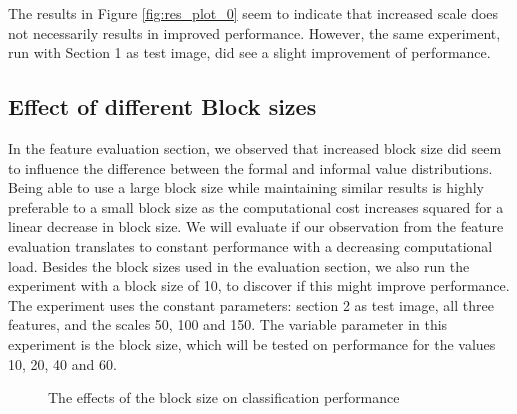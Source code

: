 The results in Figure \ref{fig:res_plot_0} seem to indicate that increased scale does not necessarily results in improved performance. However, the same experiment, run with Section 1 as test image, did see a slight improvement of performance.

\subsection{Effect of different Block sizes}
In the feature evaluation section, we observed that increased block size did seem to influence the difference between the formal and informal value distributions. Being able to use a large block size while maintaining similar results is highly preferable to a small block size as the computational cost increases squared for a linear decrease in block size. We will evaluate if our observation from the feature evaluation translates to constant performance with a decreasing computational load. Besides the block sizes used in the evaluation section, we also run the experiment with a block size of 10, to discover if this might improve performance. The experiment uses the constant parameters: section 2 as test image, all three features, and the scales 50, 100 and 150. The variable parameter in this experiment is the block size, which will be tested on performance for the values 10, 20, 40 and 60.


\datatwo

\begin{figure}
	\caption{The effects of the block size on classification performance}
	\label{fig:res_bar_2}
\end{figure}

